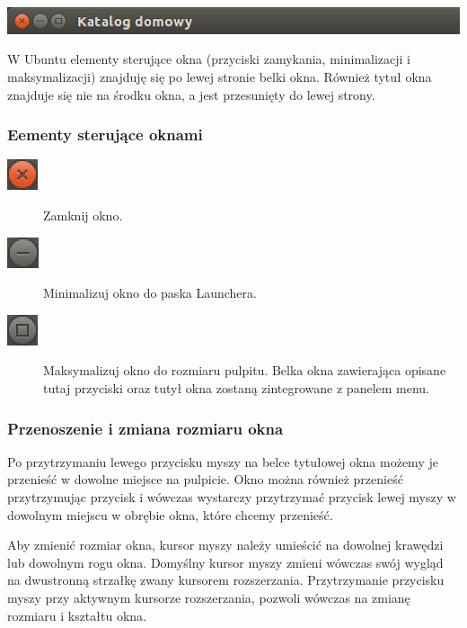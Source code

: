 \begin{center}
	\includegraphics[width=\linewidth]{images/unity_okno_belka.png}
\end{center}

W Ubuntu elementy sterujące okna (przyciski zamykania, minimalizacji i maksymalizacji) znajduję się po lewej stronie belki okna. Również tytuł okna znajduje się nie na środku okna, a jest przesunięty do lewej strony.

\subsubsection{Eementy sterujące oknami}
\begin{description}
\item[\includegraphics{images/unity_okno_exit.png}] Zamknij okno.
\item[\includegraphics{images/unity_okno_min.png}] Minimalizuj okno do paska Launchera.
\item[\includegraphics{images/unity_okno_max.png}] Maksymalizuj okno do rozmiaru pulpitu. Belka okna zawierająca opisane tutaj przyciski oraz tutył okna zostaną zintegrowane z panelem menu.
\end{description}

\subsubsection{Przenoszenie i zmiana rozmiaru okna}
Po przytrzymaniu lewego przycisku myszy na belce tytułowej okna możemy je przenieść w dowolne miejsce na pulpicie. Okno można również przenieść przytrzymując przycisk  i wówczas wystarczy przytrzymać przycisk lewej myszy w dowolnym miejscu w obrębie okna, które chcemy przenieść.

Aby zmienić rozmiar okna, kursor myszy należy umieścić na dowolnej krawędzi lub dowolnym rogu okna. Domyślny kursor myszy zmieni wówczas swój wygląd na dwustronną strzałkę zwany kursorem rozszerzania. Przytrzymanie przycisku myszy przy aktywnym kursorze rozszerzania, pozwoli wówczas na zmianę rozmiaru i kształtu okna.

